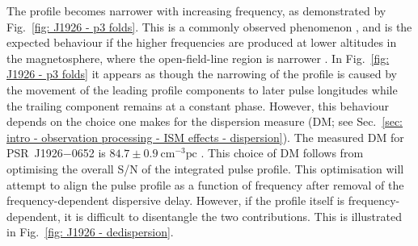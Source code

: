 The profile becomes narrower with increasing frequency, as demonstrated by Fig.~\ref{fig: J1926 - p3 folds}. This is a commonly observed phenomenon \citep[e.g.][]{CWxx2014,PHS+2016}, and is the expected behaviour if the higher frequencies are produced at lower altitudes in the magnetosphere, where the open-field-line region is narrower \citep[e.g.][]{RSxx1975,KGxx2003}. In Fig.~\ref{fig: J1926 - p3 folds} it appears as though the narrowing of the profile is caused by the movement of the leading profile components to later pulse longitudes while the trailing component remains at a constant phase. However, this behaviour depends on the choice one makes for the dispersion measure (DM; see Sec.~\ref{sec: intro - observation processing - ISM effects - dispersion}). The measured DM for PSR~J1926$-$0652 is $84.7 \pm 0.9\ \mathrm{cm}^{-3}\mathrm{pc}$ \citep{ZLH+2019}. This choice of DM follows from optimising the overall S/N of the integrated pulse profile. This optimisation will attempt to align the pulse profile as a function of frequency after removal of the frequency-dependent dispersive delay. However, if the profile itself is frequency-dependent, it is difficult to disentangle the two contributions. This is illustrated in Fig.~\ref{fig: J1926 - dedispersion}.
